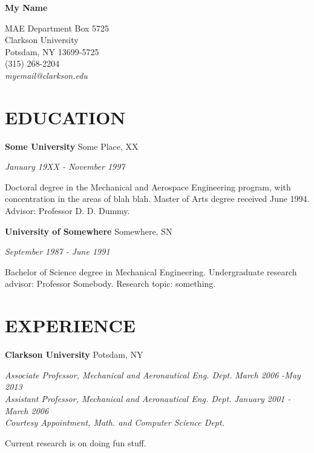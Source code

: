 

\begin{center}
\Large{\bf My Name}      %
\end{center}

\begin{center}
MAE Department Box 5725\\
Clarkson University\\
Potsdam, NY 13699-5725\\
(315) 268-2204\\
\em{myemail@clarkson.edu}
\end{center}

\section*{EDUCATION}
{\bf Some University} \hspace*{\fill}
{ Some Place, XX}
\par
{\em January 19XX - November 1997}
\par
Doctoral degree in the Mechanical and Aerospace Engineering program,
with concentration in the areas of blah blah.  Master of Arts degree received June 1994.  Advisor: Professor D. D. Dummy.
\par
\vspace{\baselineskip}
{\bf University of Somewhere} \hspace*{\fill}
{ Somewhere, SN}
\par
{\em September 1987 - June 1991}
\par
Bachelor of Science degree in Mechanical Engineering.   
Undergraduate research advisor: Professor Somebody.  Research topic: something.

\section*{EXPERIENCE}
{\bf Clarkson University}  \hspace*{\fill} Potsdam, NY
\par
{\em Associate Professor, Mechanical and Aeronautical Eng. Dept.} \hfill {\em March 2006 -May 2013}\\
{\em Assistant Professor, Mechanical and Aeronautical Eng. Dept.} \hfill {\em January 2001 - March 2006 }\\
{\em Courtesy Appointment, Math. and Computer Science Dept.} 

\par
Current research is on doing fun stuff.  

